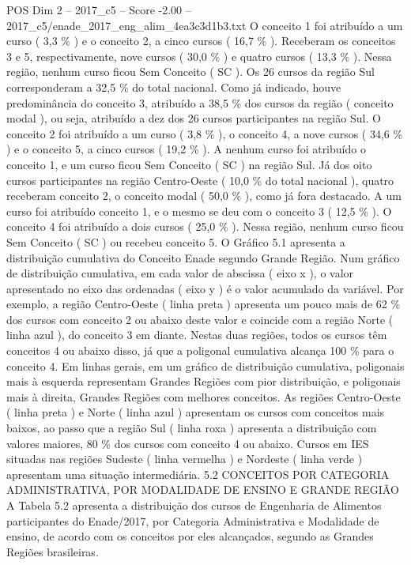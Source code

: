 \begin{textsample}{POS Dim 2 – 2017\_c5 – Score -2.00 – 2017\_c5/enade\_2017\_eng\_alim\_4ea3c3d1b3.txt}
O conceito 1 foi atribuído a um curso ( 3,3 \% ) e o conceito 2, a cinco cursos ( 16,7 \% ).
Receberam os conceitos 3 e 5, respectivamente, nove cursos ( 30,0 \% ) e quatro cursos ( 13,3 \% ).
Nessa região, nenhum curso ficou Sem Conceito ( SC ).
Os 26 cursos da região Sul corresponderam a 32,5 \% do total nacional.
Como já indicado, houve predominância do conceito 3, atribuído a 38,5 \% dos cursos da região ( conceito modal ), ou seja, atribuído a dez dos 26 cursos participantes na região Sul.
O conceito 2 foi atribuído a um curso ( 3,8 \% ), o conceito 4, a nove cursos ( 34,6 \% ) e o conceito 5, a cinco cursos ( 19,2 \% ).
A nenhum curso foi atribuído o conceito 1, e um curso ficou Sem Conceito ( SC ) na região Sul.
Já dos oito cursos participantes na região Centro-Oeste ( 10,0 \% do total nacional ), quatro receberam conceito 2, o conceito modal ( 50,0 \% ), como já fora destacado.
A um curso foi atribuído conceito 1, e o mesmo se deu com o conceito 3 ( 12,5 \% ).
O conceito 4 foi atribuído a dois cursos ( 25,0 \% ).
Nessa região, nenhum curso ficou Sem Conceito ( SC ) ou recebeu conceito 5.
O Gráfico 5.1 apresenta a distribuição cumulativa do Conceito Enade segundo Grande Região.
Num gráfico de distribuição cumulativa, em cada valor de abscissa ( eixo x ), o valor apresentado no eixo das ordenadas ( eixo y ) é o valor acumulado da variável.
Por exemplo, a região Centro-Oeste ( linha preta ) apresenta um pouco mais de 62 \% dos cursos com conceito 2 ou abaixo deste valor e coincide com a região Norte ( linha azul ), do conceito 3 em diante.
Nestas duas regiões, todos os cursos têm conceitos 4 ou abaixo disso, já que a poligonal cumulativa alcança 100 \% para o conceito 4.
Em linhas gerais, em um gráfico de distribuição cumulativa, poligonais mais à esquerda representam Grandes Regiões com pior distribuição, e poligonais mais à direita, Grandes Regiões com melhores conceitos.
As regiões Centro-Oeste ( linha preta ) e Norte ( linha azul ) apresentam os cursos com conceitos mais baixos, ao passo que a região Sul ( linha roxa ) apresenta a distribuição com valores maiores, 80 \% dos cursos com conceito 4 ou abaixo.
Cursos em IES situadas nas regiões Sudeste ( linha vermelha ) e Nordeste ( linha verde ) apresentam uma situação intermediária. 5.2 CONCEITOS POR CATEGORIA ADMINISTRATIVA, POR MODALIDADE DE ENSINO E GRANDE REGIÃO A Tabela 5.2 apresenta a distribuição dos cursos de Engenharia de Alimentos participantes do Enade/2017, por Categoria Administrativa e Modalidade de ensino, de acordo com os conceitos por eles alcançados, segundo as Grandes Regiões brasileiras.

\end{textsample}
